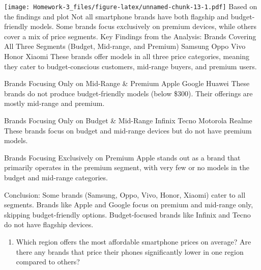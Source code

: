 \documentclass[
]{article}
\providecommand{\tightlist}{%
  \setlength{\itemsep}{0pt}\setlength{\parskip}{0pt}}
\begin{document}
\texttt{[image: Homework-3\_files/figure-latex/unnamed-chunk-13-1.pdf]}
Based on the findings and plot Not all smartphone brands have both
flagship and budget-friendly models. Some brands focus exclusively on
premium devices, while others cover a mix of price segments. Key
Findings from the Analysis: Brands Covering All Three Segments (Budget,
Mid-range, and Premium) Samsung Oppo Vivo Honor Xiaomi These brands
offer models in all three price categories, meaning they cater to
budget-conscious customers, mid-range buyers, and premium users.

Brands Focusing Only on Mid-Range \& Premium Apple Google Huawei These
brands do not produce budget-friendly models (below \$300). Their
offerings are mostly mid-range and premium.

Brands Focusing Only on Budget \& Mid-Range Infinix Tecno Motorola
Realme These brands focus on budget and mid-range devices but do not
have premium models.

Brands Focusing Exclusively on Premium Apple stands out as a brand that
primarily operates in the premium segment, with very few or no models in
the budget and mid-range categories.

Conclusion: Some brands (Samsung, Oppo, Vivo, Honor, Xiaomi) cater to
all segments. Brands like Apple and Google focus on premium and
mid-range only, skipping budget-friendly options. Budget-focused brands
like Infinix and Tecno do not have flagship devices.

\begin{enumerate}
\def\labelenumi{\arabic{enumi}.}
\setcounter{enumi}{4}
\tightlist
\item
  Which region offers the most affordable smartphone prices on average?
  Are there any brands that price their phones significantly lower in
  one region compared to others?
\end{enumerate}
\end{document}
